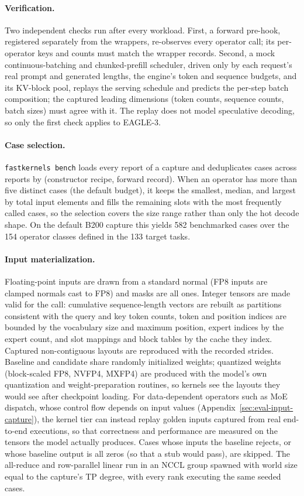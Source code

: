 \paragraph{Verification.}
Two independent checks run after every workload.
First, a forward pre-hook, registered separately from the wrappers, re-observes every operator call; its per-operator keys and counts must match the wrapper records.
Second, a mock continuous-batching and chunked-prefill scheduler, driven only by each request's real prompt and generated lengths, the engine's token and sequence budgets, and its KV-block pool, replays the serving schedule and predicts the per-step batch composition; the captured leading dimensions (token counts, sequence counts, batch sizes) must agree with it.
The replay does not model speculative decoding, so only the first check applies to EAGLE-3.

\paragraph{Case selection.}
\texttt{fastkernels bench} loads every report of a capture and deduplicates cases across reports by (constructor recipe, forward record).
When an operator has more than five distinct cases (the default budget), it keeps the smallest, median, and largest by total input elements and fills the remaining slots with the most frequently called cases, so the selection covers the size range rather than only the hot decode shape.
On the default B200 capture this yields 582 benchmarked cases over the 154 operator classes defined in the 133 target tasks.

\paragraph{Input materialization.}
Floating-point inputs are drawn from a standard normal (FP8 inputs are clamped normals cast to FP8) and masks are all ones.
Integer tensors are made valid for the call: cumulative sequence-length vectors are rebuilt as partitions consistent with the query and key token counts, token and position indices are bounded by the vocabulary size and maximum position, expert indices by the expert count, and slot mappings and block tables by the cache they index.
Captured non-contiguous layouts are reproduced with the recorded strides.
Baseline and candidate share randomly initialized weights; quantized weights (block-scaled FP8, NVFP4, MXFP4) are produced with the model's own quantization and weight-preparation routines, so kernels see the layouts they would see after checkpoint loading.
For data-dependent operators such as MoE dispatch, whose control flow depends on input values (Appendix~\ref{sec:eval-input-capture}), the kernel tier can instead replay golden inputs captured from real end-to-end executions, so that correctness and performance are measured on the tensors the model actually produces.
Cases whose inputs the baseline rejects, or whose baseline output is all zeros (so that a stub would pass), are skipped.
The all-reduce and row-parallel linear run in an NCCL group spawned with world size equal to the capture's TP degree, with every rank executing the same seeded cases.

